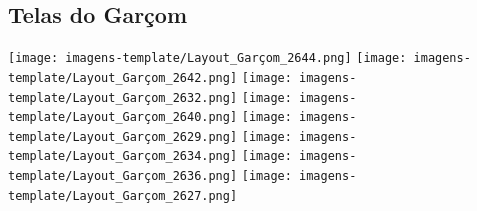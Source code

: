 \subsection{Telas do Garçom}
\begin{center}
    \texttt{[image: imagens-template/Layout\_Garçom\_2644.png]} 
    \newpage
    \texttt{[image: imagens-template/Layout\_Garçom\_2642.png]} 
    \newpage
    \texttt{[image: imagens-template/Layout\_Garçom\_2632.png]} 
    \newpage
    \texttt{[image: imagens-template/Layout\_Garçom\_2640.png]} 
    \newpage
    \texttt{[image: imagens-template/Layout\_Garçom\_2629.png]} 
    \newpage
    \texttt{[image: imagens-template/Layout\_Garçom\_2634.png]} 
    \newpage
    \texttt{[image: imagens-template/Layout\_Garçom\_2636.png]} 
    \newpage
    \texttt{[image: imagens-template/Layout\_Garçom\_2627.png]} 
    \newpage
\end{center}
